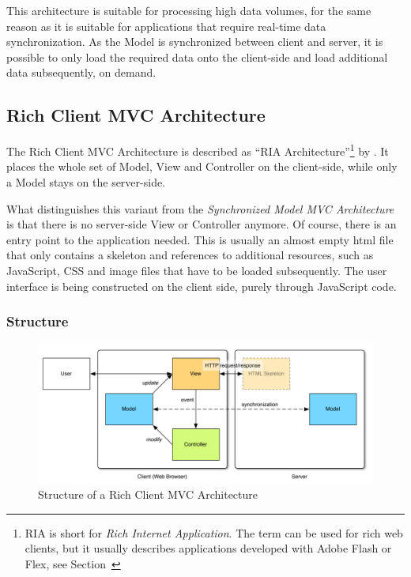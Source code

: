 This architecture is suitable for processing high data volumes, for the same reason as it is suitable for applications that require real-time data synchronization. As the Model is synchronized between client and server, it is possible to only load the required data onto the client-side and load additional data subsequently, on demand.


\subsection{Rich Client MVC Architecture}
The Rich Client MVC Architecture is described as  ``RIA Architecture''\footnote{RIA is short for \emph{Rich Internet Application}. The term can be used for rich web clients, but it usually describes applications developed with Adobe Flash or Flex, see Section~} by . It places the whole set of Model, View and Controller on the client-side, while only a Model stays on the server-side.

What distinguishes this variant from the \emph{Synchronized Model MVC Architecture} is that there is no server-side View or Controller anymore. Of course, there is an entry point to the application needed. This is usually an almost empty \ac{html} file that only contains a skeleton and references to additional resources, such as JavaScript, CSS and image files that have to be loaded subsequently. The user interface is being constructed on the client side, purely through JavaScript code.

\subsubsection{Structure}
\begin{figure}[H]
	\centering
	\includegraphics[width=16cm]{images/richclientmvc.pdf}
	\caption{Structure of a Rich Client MVC Architecture}
	\label{fig:richclientmvc}
\end{figure}

